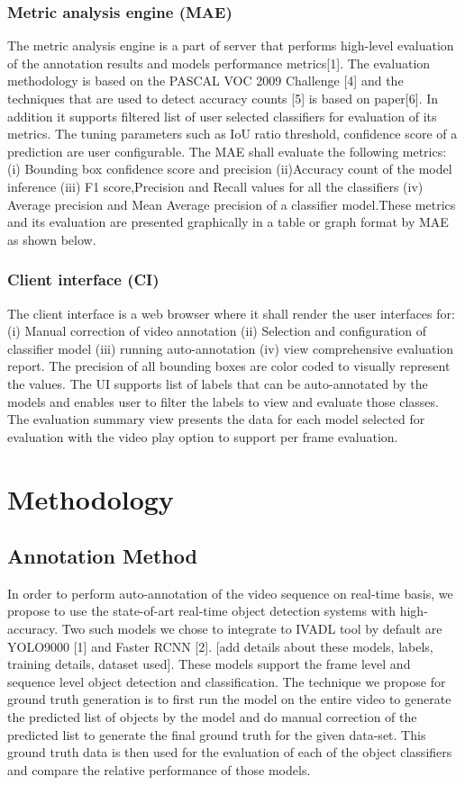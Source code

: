 \documentclass[conference]{IEEEtran}
\begin{document}
\subsubsection{Metric analysis engine (MAE)}
The metric analysis engine is a part of server that performs high-level evaluation of the annotation results and models performance metrics[1].  The evaluation methodology is based on the PASCAL VOC 2009 Challenge [4] and the techniques that are used to detect accuracy counts [5] is based on paper[6]. In addition it supports filtered list of user selected classifiers for evaluation of its metrics. The tuning parameters such as IoU ratio threshold, confidence score of a prediction are user configurable. The MAE shall evaluate the following metrics:
(i) Bounding box confidence score and precision (ii)Accuracy count of the model inference (iii) F1 score,Precision and Recall values for all the classifiers (iv) Average precision and Mean Average precision of a classifier model.These metrics and its evaluation are presented graphically in a table or graph format by MAE as shown below. 
\subsubsection{Client interface (CI)}
The client interface is a web browser where it shall render the user interfaces for: (i) Manual correction of video annotation (ii) Selection and configuration of classifier model (iii) running auto-annotation (iv) view comprehensive evaluation report. The precision of all bounding boxes are color coded to visually represent the values. The UI supports list of labels that can be auto-annotated by the models and enables user to filter the labels to view and evaluate those classes. The evaluation summary view presents the data for each model selected for evaluation with the video play option to support per frame evaluation. 


\section{Methodology}
\subsection{Annotation Method} \label{sec.annotation}
In order to perform auto-annotation of the video sequence on real-time basis, we propose to use the state-of-art real-time object detection systems with high-accuracy. Two such models we chose to integrate to IVADL tool by default are YOLO9000 [1] and Faster RCNN [2]. [add details about these models, labels, training details, dataset used]. These models support the frame level and sequence level object detection and classification. The technique we propose for ground truth generation is to first run the model on the entire video to generate the predicted list of objects by the model and do manual correction of the predicted list to generate the final ground truth for the given data-set. This ground truth data is then used for the evaluation of each of the object classifiers and compare the relative performance of those models. \par
\end{document}
